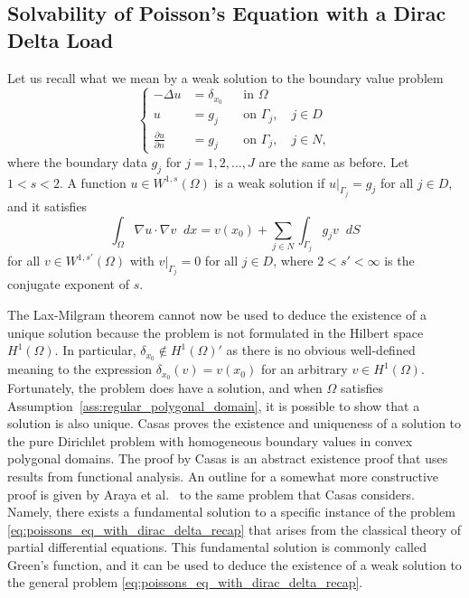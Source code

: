 \documentclass[english, 12pt, a4paper, sci, utf8, a-2b, online]{aaltothesis}
\theoremstyle{definition}
\theoremstyle{plain}
\newcommand*\diff{\mathop{}\!d}
\numberwithin{equation}{section}
\begin{document}
\subsection{Solvability of Poisson's Equation with a Dirac Delta Load}
\label{subsec:poissons_equation_with_a_concentrated_load}

Let us recall what we mean by a weak solution to the boundary value problem
\begin{equation}
    \label{eq:poissons_eq_with_dirac_delta_recap}
    \left\{
        \begin{aligned}
            -\Delta u &= \delta_{x_0} && \text{in } \Omega \\
            u &= g_j && \text{on } \Gamma_j, \quad j \in D \\
            \frac{\partial u}{\partial n} &= g_j && \text{on } \Gamma_j,
            \quad j \in N,
        \end{aligned}
    \right.
\end{equation}
where the boundary data $g_j$ for $j=1,2,\dotsc,J$ are the same as before. Let $1 < s < 2$.
A function $u \in W^{1,s}(\Omega)$ is a weak solution
if $u|_{\Gamma_j} = g_j$ for all $j \in D$, and it satisfies
\begin{equation*}
    \int_{\Omega} \nabla u \cdot \nabla v \diff x
    = v(x_0) + \sum_{j \in N} \int_{\Gamma_j} g_j v \diff S
\end{equation*}
for all $v \in W^{1,s'}(\Omega)$ with $v|_{\Gamma_j} = 0$ for all $j \in D$,
where $2 < s' < \infty$ is the conjugate exponent of $s$.

The Lax-Milgram theorem cannot now be used to deduce the existence of a unique
solution because the problem is not formulated in the Hilbert space $H^1(\Omega)$.
In particular, $\delta_{x_0} \notin H^1(\Omega)'$ as there is no obvious
well-defined meaning to the expression $\delta_{x_0}(v) = v(x_0)$ for
an arbitrary $v \in H^1(\Omega)$.
Fortunately, the problem does have a solution,
and when $\Omega$ satisfies Assumption~\ref{ass:regular_polygonal_domain},
it is possible to show that a solution is also unique.
Casas \cite{casas1985} proves the existence and uniqueness of
a solution to the pure Dirichlet problem with homogeneous boundary
values in convex polygonal domains. The proof by Casas is an abstract
existence proof that uses results from functional analysis.
An outline for a somewhat more constructive proof is given by
Araya et al.\ \cite{arayabehrens2006} to the same problem that Casas considers.
Namely, there exists a fundamental solution to a specific instance of
the problem \eqref{eq:poissons_eq_with_dirac_delta_recap} that arises from the
classical theory of partial differential equations.
This fundamental solution is commonly called Green's function,
and it can be used to deduce the existence of a weak solution to the general problem
\eqref{eq:poissons_eq_with_dirac_delta_recap}.
\end{document}
